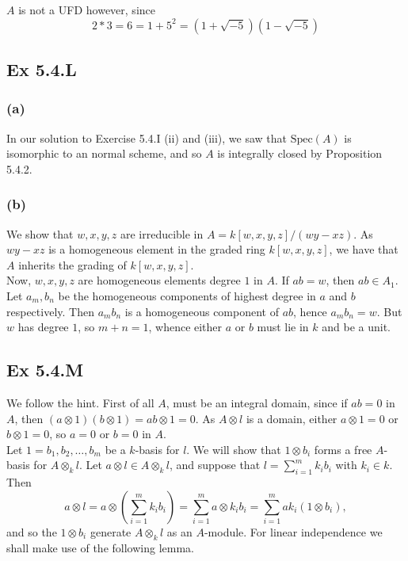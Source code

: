 \documentclass{article}
\theoremstyle{definition}
\newcommand{\Spec}{\text{Spec}}
\begin{document}
$A$ is not a UFD however, since
\[
	2 * 3 = 6 = 1 + 5^2 = (1 + \sqrt{-5})(1 - \sqrt{-5})
\]

\subsection*{Ex 5.4.L}

\subsubsection*{(a)}

In our solution to Exercise 5.4.I (ii) and (iii), we saw that $\Spec(A)$ is
isomorphic to an normal scheme, and so $A$ is integrally closed by Proposition
5.4.2.

\subsubsection*{(b)}

We show that $w,x,y,z$ are irreducible in $A = k[w,x,y,z]/(wy - xz)$. As $wy -
	xz$ is a homogeneous element in the graded ring $k[w,x,y,z]$, we have that $A$
inherits the grading of $k[w,x,y,z]$. \\

Now, $w,x,y,z$ are homogeneous elements degree $1$ in $A$. If $ab = w$, then
$ab \in A_1$. Let $a_m, b_n$ be the homogeneous components of highest degree in
$a$ and $b$ respectively. Then $a_m b_n$ is a homogeneous component of $ab$,
hence $a_m b_n = w$. But $w$ has degree $1$, so $m + n = 1$, whence either $a$
or $b$ must lie in $k$ and be a unit.

\subsection*{Ex 5.4.M}

We follow the hint. First of all $A$, must be an integral domain, since if $ab
	= 0$ in $A$, then $(a \otimes 1)(b \otimes 1) = ab \otimes 1 = 0$. As $A
	\otimes l$ is a domain, either $a \otimes 1 = 0$ or $b \otimes 1 = 0$, so $a =
	0$ or $b = 0$ in $A$. \\

Let $1 = b_1, b_2, \ldots, b_m$ be a $k$-basis for $l$. We will show that $1
	\otimes b_i$ forms a free $A$-basis for $A \otimes_{k} l$. Let $a \otimes l \in
	A \otimes_{k} l$, and suppose that $l = \sum_{i = 1}^{m} k_i b_i$ with $k_i \in
	k$. Then
\[
	a \otimes l
	=
	a \otimes \left(\sum_{i = 1}^{m} k_i b_i\right)
	=
	\sum_{i = 1}^{m} a \otimes k_i b_i
	=
	\sum_{i = 1}^{m} a k_i (1 \otimes b_i),
\]
and so the $1 \otimes b_i$ generate $A \otimes_{k} l$ as an $A$-module. For linear
independence we shall make use of the following lemma.
\end{document}
